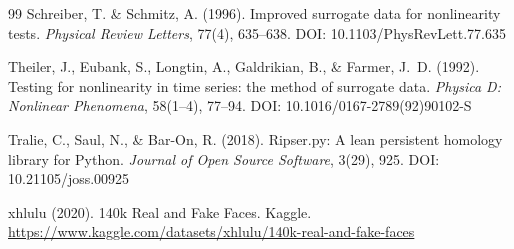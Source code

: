 \documentclass[a4paper,12pt]{article}
\begin{document}
\begin{thebibliography}{99}
Schreiber, T. \& Schmitz, A. (1996).
\newblock Improved surrogate data for nonlinearity tests.
\newblock \textit{Physical Review Letters}, 77(4), 635--638.
\newblock DOI: 10.1103/PhysRevLett.77.635

Theiler, J., Eubank, S., Longtin, A., Galdrikian, B., \& Farmer, J.~D.
(1992).
\newblock Testing for nonlinearity in time series: the method of surrogate
data.
\newblock \textit{Physica D: Nonlinear Phenomena}, 58(1--4), 77--94.
\newblock DOI: 10.1016/0167-2789(92)90102-S

Tralie, C., Saul, N., \& Bar-On, R. (2018).
\newblock Ripser.py: A lean persistent homology library for {Python}.
\newblock \textit{Journal of Open Source Software}, 3(29), 925.
\newblock DOI: 10.21105/joss.00925

xhlulu (2020).
\newblock 140k Real and Fake Faces.
\newblock Kaggle. \url{https://www.kaggle.com/datasets/xhlulu/140k-real-and-fake-faces}

\end{thebibliography}
\end{document}
